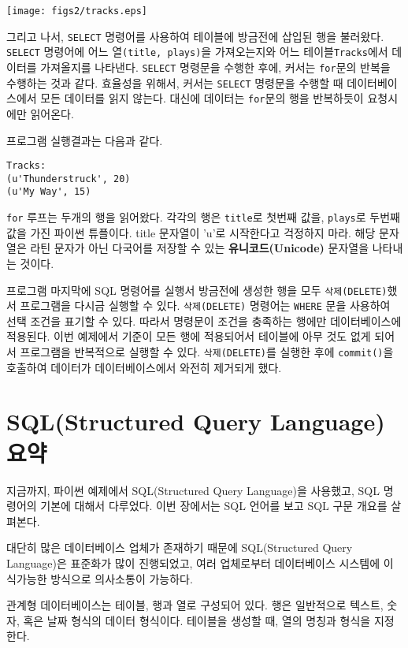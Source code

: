 \beforefig
\centerline{\texttt{[image: figs2/tracks.eps]}}
\afterfig

그리고 나서, {\tt SELECT} 명령어를 사용하여 테이블에 방금전에 삽입된 행을 불러왔다.
{\tt SELECT} 명령어에 어느 열{\tt (title, plays)}을 가져오는지와 어느 테이블{\tt Tracks}에서 데이터를 가져올지를 나타낸다.
{\tt SELECT} 명령문을 수행한 후에, 커서는 {\tt for}문의 반복을 수행하는 것과 같다.
효율성을 위해서, 커서는 {\tt SELECT} 명령문을 수행할 때 데이터베이스에서 모든 데이터를 읽지 않는다. 
대신에 데이터는 {\tt for}문의 행을 반복하듯이 요청시에만 읽어온다.

프로그램 실행결과는 다음과 같다.

\beforeverb
\begin{verbatim}
Tracks:
(u'Thunderstruck', 20)
(u'My Way', 15)
\end{verbatim}
\afterverb
%

{\tt for} 루프는 두개의 행을 읽어왔다. 각각의 행은 {\tt title}로 첫번째 값을,
{\tt plays}로 두번째 값을 가진 파이썬 튜플이다. title 문자열이 'u'로 시작한다고 걱정하지 마라.
해당 문자열은 라틴 문자가 아닌 다국어를 저장할 수 있는 {\bf 유니코드(Unicode)} 문자열을 나타내는 것이다.

프로그램 마지막에 SQL 명령어를 실행서 방금전에 생성한 행을 모두 {\tt 삭제(DELETE)}했서
프로그램을 다시금 실행할 수 있다. {\tt 삭제(DELETE)} 명령어는 {\tt WHERE} 문을 사용하여 선택 조건을 표기할 수 있다.
따라서 명령문이 조건을 충족하는 행에만 데이터베이스에 적용된다.
이번 예제에서 기준이 모든 행에 적용되어서 테이블에 아무 것도 없게 되어서 프로그램을 반복적으로 실행할 수 있다.
{\tt 삭제(DELETE)}를 실행한 후에 {\tt commit()}을 호출하여 데이터가 데이터베이스에서 와전히 제거되게 했다.

\section{SQL(Structured Query Language) 요약}

지금까지, 파이썬 예제에서 SQL(Structured Query Language)을 사용했고, SQL 명령어의 기본에 대해서 다루었다.
이번 장에서는 SQL 언어를 보고 SQL 구문 개요를 살펴본다.

대단히 많은 데이터베이스 업체가 존재하기 때문에 SQL(Structured Query Language)은 표준화가 많이 진행되었고,
여러 업체로부터 데이터베이스 시스템에 이식가능한 방식으로 의사소통이 가능하다.

관계형 데이터베이스는 테이블, 행과 열로 구성되어 있다. 행은 일반적으로 텍스트, 숫자, 혹은 날짜 형식의 데이터 형식이다.
테이블을 생성할 때, 열의 명칭과 형식을 지정한다.

